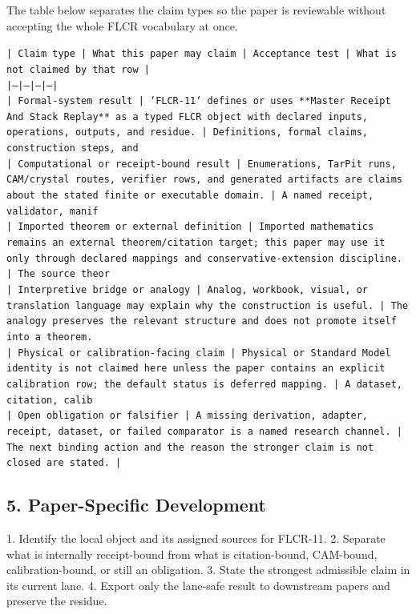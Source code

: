 \documentclass[11pt]{article}
\begin{document}
The table below separates the claim types so the paper is reviewable without accepting the whole FLCR vocabulary at once.

\noindent\texttt{| Claim type | What this paper may claim | Acceptance test | What is not claimed by that row |}\\
\noindent\texttt{|---|---|---|---|}\\
\noindent\texttt{| Formal-system result | `FLCR-11` defines or uses **Master Receipt And Stack Replay** as a typed FLCR object with declared inputs, operations, outputs, and residue. | Definitions, formal claims, construction steps, and }\\
\noindent\texttt{| Computational or receipt-bound result | Enumerations, TarPit runs, CAM/crystal routes, verifier rows, and generated artifacts are claims about the stated finite or executable domain. | A named receipt, validator, manif}\\
\noindent\texttt{| Imported theorem or external definition | Imported mathematics remains an external theorem/citation target; this paper may use it only through declared mappings and conservative-extension discipline. | The source theor}\\
\noindent\texttt{| Interpretive bridge or analogy | Analog, workbook, visual, or translation language may explain why the construction is useful. | The analogy preserves the relevant structure and does not promote itself into a theorem. }\\
\noindent\texttt{| Physical or calibration-facing claim | Physical or Standard Model identity is not claimed here unless the paper contains an explicit calibration row; the default status is deferred mapping. | A dataset, citation, calib}\\
\noindent\texttt{| Open obligation or falsifier | A missing derivation, adapter, receipt, dataset, or failed comparator is a named research channel. | The next binding action and the reason the stronger claim is not closed are stated. | }\\

\subsection*{5. Paper-Specific Development}

1. Identify the local object and its assigned sources for FLCR-11.
2. Separate what is internally receipt-bound from what is citation-bound, CAM-bound, calibration-bound, or still an obligation.
3. State the strongest admissible claim in its current lane.
4. Export only the lane-safe result to downstream papers and preserve the residue.
\end{document}
